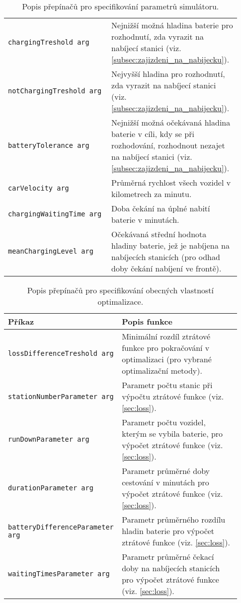 \begin{table}
\begin{tabular}{p{0.43\linewidth} p{0.5\linewidth}}
\texttt{chargingTreshold arg} & Nejnižší možná hladina baterie pro rozhodnutí,
    zda vyrazit na nabíjecí stanici (viz. \cref{subsec:zajizdeni_na_nabijecku}). \\
\texttt{notChargingTreshold arg} & Nejvyšší hladina pro rozhodnutí, zda vyrazit na 
    nabíjecí stanici (viz. \cref{subsec:zajizdeni_na_nabijecku}). \\
\texttt{batteryTolerance arg} & Nejnižší možná očekávaná hladina baterie v cíli, 
    kdy se při rozhodování, rozhodnout nezajet na nabíjecí stanici 
    (viz. \cref{subsec:zajizdeni_na_nabijecku}). \\
\texttt{carVelocity arg} & Průměrná rychlost všech vozidel v kilometrech za minutu. \\
\texttt{chargingWaitingTime arg} & Doba čekání na úplné nabití baterie v minutách.  \\
\texttt{meanChargingLevel arg} & Očekávaná střední hodnota hladiny baterie, jež
    je nabíjena na nabíjecích stanicích (pro odhad doby čekání nabíjení ve frontě).  \\
\bottomrule
\end{tabular}
\caption{Popis přepínačů pro specifikování parametrů simulátoru.}
\label{tab:prepinace_simulace}
\end{table}


\begin{table}
\centering\footnotesize\sf
\begin{tabular}{p{0.42\linewidth} p{0.51\linewidth}}
\toprule
Příkaz & Popis funkce \\
\midrule
\texttt{lossDifferenceTreshold arg} & Minimální rozdíl ztrátové funkce pro 
pokračování v optimalizaci (pro vybrané optimalizační metody). \\
\texttt{stationNumberParameter arg} & Parametr počtu stanic při výpočtu ztrátové 
funkce (viz. \cref{sec:loss}).\\
\texttt{runDownParameter arg} & Parametr počtu vozidel, kterým se vybila baterie,
pro výpočet ztrátové funkce (viz. \cref{sec:loss}).\\
\texttt{durationParameter arg} & Parametr průměrné doby cestování v minutách pro
výpočet ztrátové funkce (viz. \cref{sec:loss}).\\
\texttt{batteryDifferenceParameter arg} & Parametr průměrného rozdílu hladin 
baterie pro výpočet ztrátové funkce (viz. \cref{sec:loss}).\\
\texttt{waitingTimesParameter arg} & Parametr průměrné čekací doby na nabíjecích
stanicích pro výpočet ztrátové funkce (viz. \cref{sec:loss}).\\
\bottomrule
\end{tabular}
\caption{Popis přepínačů pro specifikování obecných vlastností optimalizace.}
\label{tab:prepinace_optimalizace}
\end{table}


